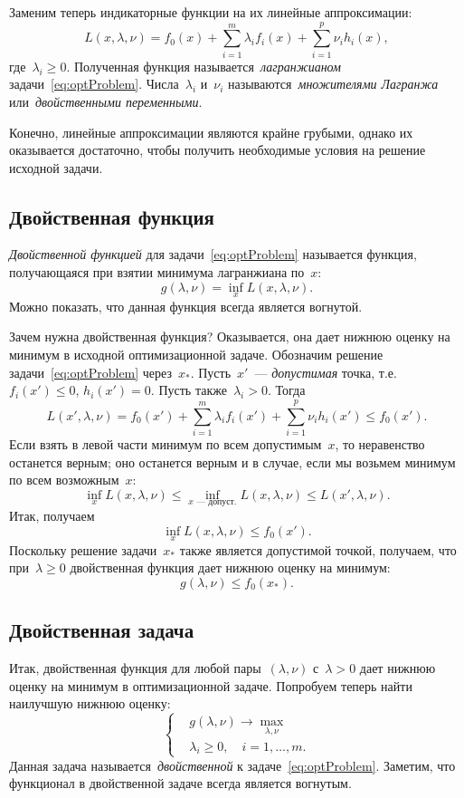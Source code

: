 \documentclass[12pt,fleqn]{article}
\begin{document}
Заменим теперь индикаторные функции на их линейные аппроксимации:
\[
    L(x, \lambda, \nu)
    =
    f_0(x)
    +
    \sum_{i = 1}^{m} \lambda_i f_i(x)
    +
    \sum_{i = 1}^{p} \nu_i h_i(x),
\]
где~$\lambda_i \geq 0$.
Полученная функция называется~\emph{лагранжианом} задачи~\eqref{eq:optProblem}.
Числа~$\lambda_i$ и~$\nu_i$ называются~\emph{множителями Лагранжа}
или~\emph{двойственными переменными}.

Конечно, линейные аппроксимации являются крайне грубыми,
однако их оказывается достаточно, чтобы получить необходимые условия
на решение исходной задачи.

\subsection{Двойственная функция}
\emph{Двойственной функцией} для задачи~\eqref{eq:optProblem} называется функция,
получающаяся при взятии минимума лагранжиана по~$x$:
\[
    g(\lambda, \nu)
    =
    \inf_{x} L(x, \lambda, \nu).
\]
Можно показать, что данная функция всегда является вогнутой.

Зачем нужна двойственная функция?
Оказывается, она дает нижнюю оценку на минимум в исходной оптимизационной задаче.
Обозначим решение задачи~\eqref{eq:optProblem} через~$x_*$.
Пусть~$x'$~--- \emph{допустимая} точка, т.е.~$f_i(x') \leq 0$, $h_i(x') = 0$.
Пусть также~$\lambda_i > 0$.
Тогда
\[
    L(x', \lambda, \nu)
    =
    f_0(x')
    +
    \sum_{i = 1}^{m} \lambda_i f_i(x')
    +
    \sum_{i = 1}^{p} \nu_i h_i(x')
    \leq
    f_0(x').
\]
Если взять в левой части минимум по всем допустимым~$x$, то неравенство останется верным;
оно останется верным и в случае, если мы возьмем минимум по всем возможным~$x$:
\[
    \inf_x L(x, \lambda, \nu)
    \leq
    \inf_{x \text{\ --- допуст.}} L(x, \lambda, \nu)
    \leq
    L(x', \lambda, \nu).
\]
Итак, получаем
\[
    \inf_{x} L(x, \lambda, \nu)
    \leq
    f_0(x').
\]
Поскольку решение задачи~$x_*$ также является допустимой точкой, получаем,
что при~$\lambda \geq 0$ двойственная функция дает нижнюю оценку на минимум:
\[
    g(\lambda, \nu) \leq f_0(x_*).
\]

\subsection{Двойственная задача}
Итак, двойственная функция для любой пары~$(\lambda, \nu)$ с~$\lambda > 0$
дает нижнюю оценку на минимум в оптимизационной задаче.
Попробуем теперь найти наилучшую нижнюю оценку:
\begin{equation}
\label{eq:dualProblem}
    \left\{
        \begin{aligned}
            & g(\lambda, \nu) \to \max_{\lambda, \nu} \\
            & \lambda_i \geq 0, \quad i = 1, \dots, m.
        \end{aligned}
    \right.
\end{equation}
Данная задача называется~\emph{двойственной} к задаче~\eqref{eq:optProblem}.
Заметим, что функционал в двойственной задаче всегда является вогнутым.
\end{document}
